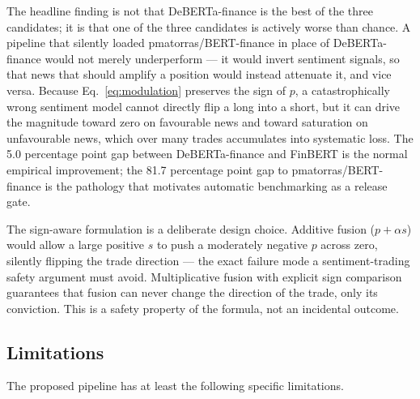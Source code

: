 \documentclass[conference]{IEEEtran}
\begin{document}
The headline finding is not that DeBERTa-finance is the best of the three
candidates; it is that one of the three candidates is actively worse than
chance. A pipeline that silently loaded pmatorras/BERT-finance in place of
DeBERTa-finance would not merely underperform --- it would invert sentiment
signals, so that news that should amplify a position would instead attenuate
it, and vice versa. Because Eq.~\eqref{eq:modulation} preserves the sign of
$p$, a catastrophically wrong sentiment model cannot directly flip a long
into a short, but it can drive the magnitude toward zero on favourable news
and toward saturation on unfavourable news, which over many trades accumulates
into systematic loss. The 5.0 percentage point gap between DeBERTa-finance
and FinBERT is the normal empirical improvement; the 81.7 percentage point
gap to pmatorras/BERT-finance is the pathology that motivates automatic
benchmarking as a release gate.

The sign-aware formulation is a deliberate design choice. Additive fusion
($p + \alpha s$) would allow a large positive $s$ to push a moderately
negative $p$ across zero, silently flipping the trade direction --- the exact
failure mode a sentiment-trading safety argument must avoid. Multiplicative
fusion with explicit sign comparison guarantees that fusion can never change
the direction of the trade, only its conviction. This is a safety property of
the formula, not an incidental outcome.

\subsection{Limitations}
\label{sec:limits}

The proposed pipeline has at least the following specific limitations.
\end{document}
